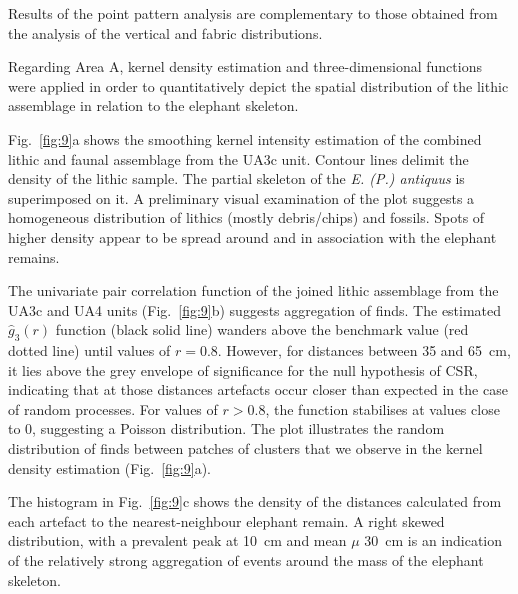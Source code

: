 \documentclass[review,authoryear,times]{elsarticle} %
\begin{document}
Results of the point pattern analysis are complementary to those obtained from the analysis of the vertical and fabric distributions.  


Regarding Area A, kernel density estimation and three-dimensional functions were applied in order to quantitatively depict the spatial distribution of the lithic assemblage in relation to the elephant skeleton.

Fig.~\ref{fig:9}a shows the smoothing kernel intensity estimation of the combined lithic and faunal assemblage from the UA3c unit. Contour lines delimit the density of the lithic sample. The partial skeleton of the \emph{E. (P.) antiquus} is superimposed on it. A preliminary visual examination of the plot suggests a homogeneous distribution of lithics (mostly debris/chips) and fossils. Spots of higher density appear to be spread around and in association with the elephant remains.

The univariate pair correlation function of the joined lithic assemblage from the UA3c and UA4 units (Fig.~\ref{fig:9}b) suggests aggregation of finds. The estimated $\hat{g}_3(r)$ function (black solid line) wanders above the benchmark value (red dotted line) until values of $r=0.8$. However, for distances between 35 and 65~cm, it lies above the grey envelope of significance for the null hypothesis of CSR, indicating that at those distances artefacts occur closer than expected in the case of random processes. For values of $r>0.8$, the function stabilises at values close to 0, suggesting a Poisson distribution. The plot illustrates the random distribution of finds between patches of clusters that we observe in the kernel density estimation (Fig.~\ref{fig:9}a).

The histogram in Fig.~\ref{fig:9}c shows the density of the distances calculated from each artefact to the nearest-neighbour elephant remain. A right skewed distribution, with a prevalent peak at 10~cm and mean $\mu$ 30~cm is an indication of the relatively strong aggregation of events around the mass of the elephant skeleton.
\end{document}
